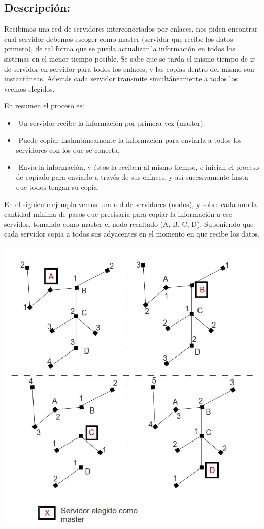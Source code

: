 \subsection{Descripción:}

Recibimos una red de servidores interconectados por enlaces, nos piden encontrar cual servidor debemos escoger como master (servidor que recibe los datos primero), de tal forma que se pueda actualizar la información en todos los sistemas en el menor tiempo posible.
Se sabe que se tarda el mismo tiempo de ir de servidor en servidor para todos los enlaces, y las copias dentro del mismo son instantáneas.
Además cada servidor transmite simultáneamente a todos los vecinos elegidos.

En resumen el proceso es:
\begin{itemize}
\item -Un servidor recibe la información por primera vez (master).
\item-Puede copiar instantáneamente la información para enviarla a todos los servidores con los que se conecta.
\item-Envía la información, y éstos la reciben al mismo tiempo, e inician el proceso de copiado para enviarlo a través de sus enlaces, y asi sucesivamente hasta que todos tengan su copia.
\end{itemize}
En el siguiente ejemplo vemos una red de servidores (nodos), y sobre cada uno la cantidad mínima de pasos que precisaría para copiar la información a ese servidor, tomando como master el nodo resaltado (A, B, C, D). Suponiendo que cada servidor copia a todos sus adyacentes en el momento en que recibe los datos.

\begin{center}
\includegraphics[scale=0.6]{ej2/2/graficos/ej01ej2b.jpg} 
\end{center}

